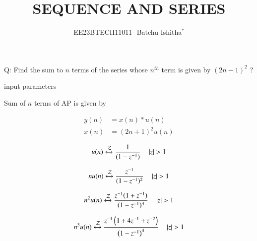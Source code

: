 \documentclass[journal,12pt,onecolumn]{IEEEtran}
\theoremstyle{remark}
\begin{document}
\let\vec\mathbf



\title{SEQUENCE AND SERIES}
\author{EE23BTECH11011- Batchu Ishitha$^{*}$%
}
\maketitle




\bigskip

\renewcommand{\thefigure}{\theenumi}
\renewcommand{\thetable}{\theenumi}

Q: Find the sum to $n$ terms of the series whose $n^{th}$ term is given by $(2n-1)^2$ ?

\solution

\begin{table}[!ht]
    \centering
        
    \caption{input parameters}
    \label{}
\end{table}

Sum of $n$ terms of AP is given by

\begin{align}
 y(n)&=x(n)*u(n) \\
x(n)&= (2n+1)^2 u(n) 
\end{align}

\begin{equation}
   u(n) \xleftrightarrow{\mathcal{Z}} \frac{1}{(1-z^{-1})}  \quad \left\vert z\right\vert>1\\ \label{eq:11.9.4.10.1.eq}
\end{equation}

\begin{equation}   
   nu(n) \xleftrightarrow{\mathcal{Z}} \frac{z^{-1}}{(1-z^{-1})^2} \quad \left\vert z\right\vert>1\\ \label{eq:11.9.4.10.2.eq}
\end{equation}

\begin{equation}   
   n^2u(n) \xleftrightarrow{\mathcal{Z}} \frac{z^{-1}(1+z^{-1})}{(1-z^{-1})^3} \quad \left\vert z\right\vert>1 \\ \label{eq:11.9.4.10.3.eq}
\end{equation}  

\begin{equation}
n^3u(n) \xleftrightarrow{\mathcal{Z}} \frac{z^{-1}\left(1+4z^{-1}+z^{-2}\right)}{\left(1-z^{-1}\right)^4} \quad \left\vert z\right\vert>1 \\ \label{eq:11.9.4.10.4.eq}
\end{equation} 
 
\end{document}
